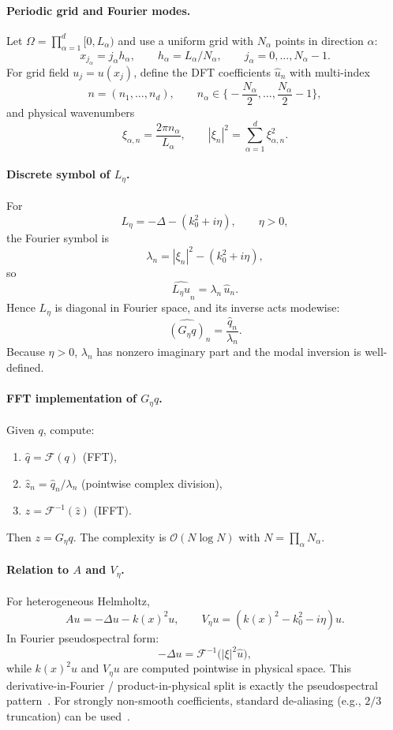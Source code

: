 \documentclass{article}
\theoremstyle{plain}
\theoremstyle{remark}
\begin{document}
\paragraph{Periodic grid and Fourier modes.}
Let $\Omega=\prod_{\alpha=1}^d [0,L_\alpha)$ and use a uniform grid with $N_\alpha$ points in direction $\alpha$:
\[
x_{j_\alpha}=j_\alpha h_\alpha,\qquad
h_\alpha=L_\alpha/N_\alpha,\qquad
j_\alpha=0,\dots,N_\alpha-1.
\]
For grid field $u_j=u(x_j)$, define the DFT coefficients $\widehat u_n$ with multi-index
\[
n=(n_1,\dots,n_d),\qquad
n_\alpha\in\Big\{-\frac{N_\alpha}{2},\dots,\frac{N_\alpha}{2}-1\Big\},
\]
and physical wavenumbers
\[
\xi_{\alpha,n}=\frac{2\pi n_\alpha}{L_\alpha},\qquad
|\xi_n|^2=\sum_{\alpha=1}^d \xi_{\alpha,n}^2.
\]

\paragraph{Discrete symbol of $L_\eta$.}
For
\[
L_\eta=-\Delta-(k_0^2+i\eta),\qquad \eta>0,
\]
the Fourier symbol is
\[
\lambda_n = |\xi_n|^2-(k_0^2+i\eta),
\]
so
\[
\widehat{L_\eta u}_n=\lambda_n\,\widehat u_n.
\]
Hence $L_\eta$ is diagonal in Fourier space, and its inverse acts modewise:
\[
\widehat{(G_\eta q)}_n = \frac{\widehat q_n}{\lambda_n}.
\]
Because $\eta>0$, $\lambda_n$ has nonzero imaginary part and the modal inversion is well-defined.

\paragraph{FFT implementation of $G_\eta q$.}
Given $q$, compute:
\begin{enumerate}
\item $\widehat q=\mathcal{F}(q)$ (FFT),
\item $\widehat z_n=\widehat q_n/\lambda_n$ (pointwise complex division),
\item $z=\mathcal{F}^{-1}(\widehat z)$ (IFFT).
\end{enumerate}
Then $z=G_\eta q$. The complexity is $\mathcal{O}(N\log N)$ with $N=\prod_\alpha N_\alpha$.

\paragraph{Relation to $A$ and $V_\eta$.}
For heterogeneous Helmholtz,
\[
A u = -\Delta u - k(x)^2u,\qquad
V_\eta u=(k(x)^2-k_0^2-i\eta)u.
\]
In Fourier pseudospectral form:
\[
-\Delta u = \mathcal{F}^{-1}\!\big(|\xi|^2\widehat u\big),
\]
while $k(x)^2u$ and $V_\eta u$ are computed pointwise in physical space. This derivative-in-Fourier / product-in-physical split is exactly the pseudospectral pattern~\cite{boyd2001chebyshev,trefethen2000spectral}. For strongly non-smooth coefficients, standard de-aliasing (e.g., $2/3$ truncation) can be used~\cite{shen2011spectral}.
\end{document}

